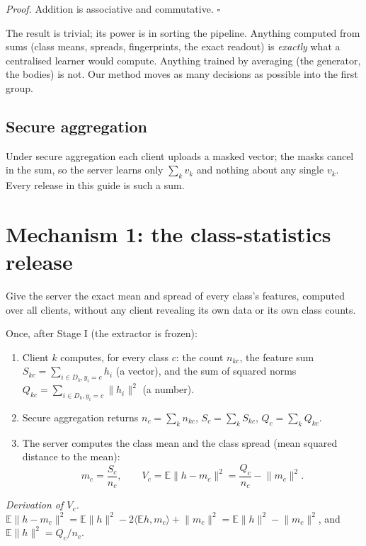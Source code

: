 \documentclass[11pt]{article}
\theoremstyle{plain}
\theoremstyle{definition}
\newcommand{\E}{\mathbb{E}}
\newcommand{\norm}[1]{\lVert #1\rVert}
\begin{document}
\emph{Proof.} Addition is associative and commutative. $\square$

The result is trivial; its power is in sorting the pipeline. Anything computed from sums (class means, spreads,
fingerprints, the exact readout) is \emph{exactly} what a centralised learner would compute. Anything trained by
averaging (the generator, the bodies) is not. Our method moves as many decisions as possible into the first group.

\subsection{Secure aggregation}

Under secure aggregation each client uploads a masked vector; the masks cancel in the sum, so the server learns only
$\sum_k v_k$ and nothing about any single $v_k$. Every release in this guide is such a sum.

\section{Mechanism 1: the class-statistics release}\label{sec:release}

\begin{purpose}
Give the server the exact mean and spread of every class's features, computed over all clients, without any client
revealing its own data or its own class counts.
\end{purpose}

\begin{steps}
Once, after Stage I (the extractor is frozen):
\begin{enumerate}
\item Client $k$ computes, for every class $c$: the count $n_{kc}$, the feature sum $S_{kc}=\sum_{i\in D_k,y_i=c}h_i$
(a vector), and the sum of squared norms $Q_{kc}=\sum_{i\in D_k,y_i=c}\norm{h_i}^2$ (a number).
\item Secure aggregation returns $n_c=\sum_kn_{kc}$, $S_c=\sum_kS_{kc}$, $Q_c=\sum_kQ_{kc}$.
\item The server computes the class mean and the class spread (mean squared distance to the mean):
\[
m_c=\frac{S_c}{n_c},\qquad V_c=\E\norm{h-m_c}^2=\frac{Q_c}{n_c}-\norm{m_c}^2 .
\]
\end{enumerate}
\end{steps}

\emph{Derivation of $V_c$.} $\E\norm{h-m_c}^2=\E\norm h^2-2\langle\E h,m_c\rangle+\norm{m_c}^2=\E\norm h^2-\norm{m_c}^2$,
and $\E\norm h^2=Q_c/n_c$.
\end{document}
